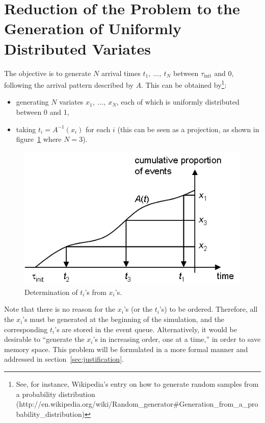 \documentclass[12pt]{article} %
\begin{document}
\section{Reduction of the Problem to the Generation of Uniformly Distributed Variates}
%
The objective is to generate $N$ arrival times $t_1,\ \ldots,\ t_N$
between $\tau_\text{init}$ and 0, following the arrival pattern
described by $A$. This can be obtained by\footnote{See, for instance,
  Wikipedia's entry on how to generate random samples from a probability
  distribution
  (http://en.wikipedia.org/wiki/Random\_generator\#Generation\_from\_a\_probability\_distribution)}:
\begin{itemize}
\item generating $N$ variates $x_1,\ \ldots,\ x_N$, each of which is
  uniformly distributed between 0 and 1,
\item taking $t_i = A^{-1}(x_i)$ for each $i$ (this can be seen as a
  projection, as shown in figure~\ref{fig:projection} where $N=3$).
\end{itemize}
\begin{figure}[ht]
\centering
\includegraphics{projection}
\vspace{-4mm}
\caption{Determination of $t_i$'s from $x_i$'s.}
\label{fig:projection}
\end{figure}
Note that there is no reason for the $x_i$'s (or the $t_i$'s) to be
ordered. Therefore, all the $x_i$'s must be generated at the beginning
of the simulation, and the corresponding $t_i$'s are stored in the
event queue. Alternatively, it would be desirable to ``generate the
$x_i$'s in increasing order, one at a time,'' in order to save memory
space. This problem will be formulated in a more formal manner and
addressed in section~\ref{sec:justification}.
%
%
\end{document}
